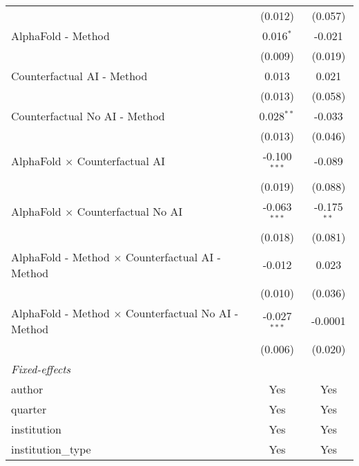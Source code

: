 \begin{tabular}{lcc}
                                                              & (0.012)        & (0.057)\\   
   AlphaFold - Method                                         & 0.016$^{*}$    & -0.021\\   
                                                              & (0.009)        & (0.019)\\   
   Counterfactual AI - Method                                 & 0.013          & 0.021\\   
                                                              & (0.013)        & (0.058)\\   
   Counterfactual No AI - Method                              & 0.028$^{**}$   & -0.033\\   
                                                              & (0.013)        & (0.046)\\   
   AlphaFold $\times$ Counterfactual AI                       & -0.100$^{***}$ & -0.089\\   
                                                              & (0.019)        & (0.088)\\   
   AlphaFold $\times$ Counterfactual No AI                    & -0.063$^{***}$ & -0.175$^{**}$\\   
                                                              & (0.018)        & (0.081)\\   
   AlphaFold - Method $\times$ Counterfactual AI - Method     & -0.012         & 0.023\\   
                                                              & (0.010)        & (0.036)\\   
   AlphaFold - Method $\times$ Counterfactual No AI - Method  & -0.027$^{***}$ & -0.0001\\   
                                                              & (0.006)        & (0.020)\\   
   \midrule
   \emph{Fixed-effects}\\
   author                                                     & Yes            & Yes\\  
   quarter                                                    & Yes            & Yes\\  
   institution                                                & Yes            & Yes\\  
   institution\_type                                          & Yes            & Yes\\  

\end{tabular}

